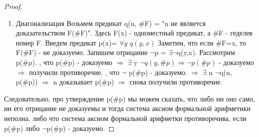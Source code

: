 \documentclass[a4paper]{article}
\begin{document}
{\begin{proof}
\begin{enumerate}
\\Зададим эту команду при помощи предикатов:
\\$Q_r(t)$ = "ММ находится в состоянии $q_r$ в такт №t"
\\$R_l(t, x)$ = "$R_l$ = x в такт №t"
\\Тогда описание команды будет выглядеть следующим образом:
\\$Q_i(t)\&R_p(t,x) \Rightarrow Q_j(t)\&R_p(t+1,x+1)$
\\Заметим, что все остальные команды для ММ можно выразить сходным образом точно так же, как и дополнительные предикаты, необходимые, чтобы гарантировать корректность состояния ММ, например, предикат о том, что в одном регистре не может быть два числа одновременно:
\\$\forall t,x,y R_i(t,x)=R_i(t,y) \Rightarrow Ex(x,y)$, где Ex(x,y) = "x=y"
\\Далее все предикаты связываются в одну большую формулу при помощи конъюнкции. 
\\Осталось записать, что ММ остановится в состоянии $q_y$. Делается это так:
\\$\exists t$ $q_y(t)$.
\newline В итоге мы получаем некую гигантскую формулу предикатов, эмулирующую ММ. То есть мы выяснили, что P(x, y) - это предикат, который можно выразить при помощи аксиоматики формальной арифметики.
\item Диагонализация
\newline Возьмем предикат q(n, \#F) = "n не является доказательством F(\#F)". Здесь F(x) - одноместный предикат, а \#F - геделев номер F. 
\newline Введем предикат p(x)= $\forall y$ $q(y,x)$
\newline Заметим, что если \#F=x, то F(\#F) - не доказуемо.
\newline Запишем отрицание $\neg$p = $\exists \neg$q(y,x).
\newline Рассмотрим p(\#p).
, что p(\#p) - доказуемо $\Rightarrow$ $\exists$ y $\neg   q(y,\#p) \Rightarrow \neg p(\#p)$ - доказуемо $\Rightarrow$ получили противоречие. 
, что $\neg$ p(\#p) - доказуемо. $\Rightarrow$ $\exists$ n $\neg$q(n, p(\#p)) $\Rightarrow$ n доказывает p(\#p) $\Rightarrow$ снова получили противоречие.
\end{enumerate}
Следовательно, про утверждение p(\#p) мы можем сказать, что либо ни оно само, ни его отрицание не доказуемы и тогда система аксиом формальной арифметики неполна, либо что система аксиом формальной арифметки противоречива, если p(\#p) либо $\neg$p(\#p) - доказуемо.
\end{proof}

}
\end{document}
